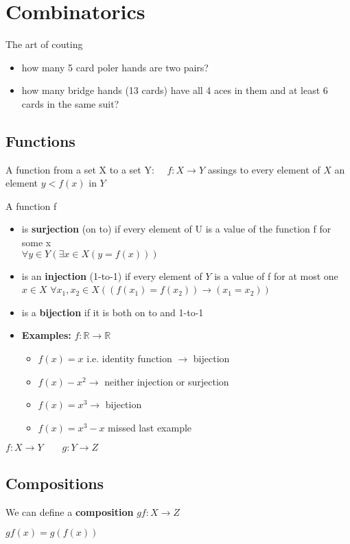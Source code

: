 \documentclass[9pt, letterpaper, oneside]{article}
\begin{document}
\section{Combinatorics}

The art of couting
\begin{itemize}
\item how many 5 card poler hands are two pairs?
\item how many bridge hands (13 cards) have all 4 aces in them and at least 6 cards in the same suit?
\end{itemize}

\subsection{Functions}
A function from a set X to a set Y: $\quad f: X \to Y$ assings to every element of $X$ an element $y < f(x)$ in $Y$

A function f
\begin{itemize}
    \item is \textbf{surjection} (on to) if every element of U is a value of the function f for some x\\
    $\forall y \in Y (\exists x \in X (y = f(x)))$
    \item is an \textbf{injection} (1-to-1) if every element of $Y$ is a value of f for at most one $x \in X$
    $\forall x_1, x_2 \in X ((f(x_1) = f(x_2))\to(x_1 = x_2))$
    \item is a \textbf{bijection} if it is both on to and 1-to-1
    \item \textbf{Examples:} $f: \mathbb{R} \to \mathbb{R}$
    \begin{itemize}
        \item $f(x) = x$ i.e. identity function $\to$ bijection
        \item $f(x) - x^2 \to$ neither injection or surjection
        \item $f(x) = x^3 \to$ bijection
        \item $f(x) = x^3 - x $ missed last example
    \end{itemize} 
\end{itemize}
$f:X \to Y \qquad g: Y \to Z$

\subsection{Compositions}
We can define a \textbf{composition} $gf: X \to Z$

$gf (x) = g(f(x))$
\end{document}
